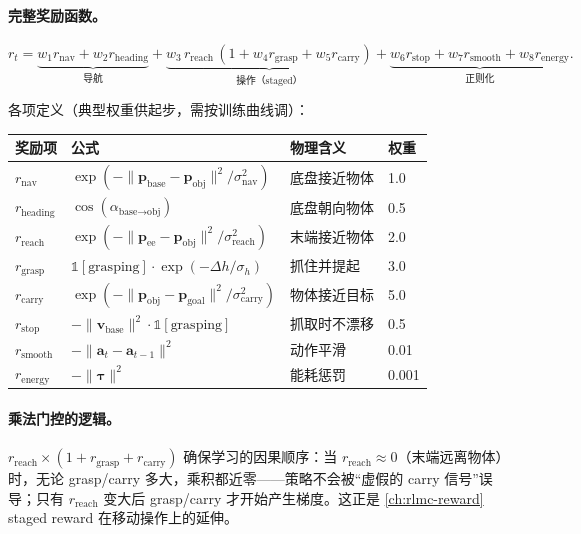 \paragraph{完整奖励函数。}

\begin{equation}
r_t=\underbrace{w_1 r_{\text{nav}}+w_2 r_{\text{heading}}}_{\text{导航}}
+\underbrace{w_3\, r_{\text{reach}}\,(1+w_4 r_{\text{grasp}}+w_5 r_{\text{carry}})}_{\text{操作（staged）}}
+\underbrace{w_6 r_{\text{stop}}+w_7 r_{\text{smooth}}+w_8 r_{\text{energy}}}_{\text{正则化}}.
\label{eq:rlmc-wh-reward}
\end{equation}

各项定义（典型权重供起步，需按训练曲线调）：

\begin{center}
\small
\begin{tabular}{@{}lll l@{}}
\toprule
奖励项 & 公式 & 物理含义 & 权重 \\
\midrule
$r_{\text{nav}}$ & $\exp(-\lVert\mathbf{p}_{\text{base}}-\mathbf{p}_{\text{obj}}\rVert^2/\sigma_{\text{nav}}^2)$ & 底盘接近物体 & 1.0 \\
$r_{\text{heading}}$ & $\cos(\alpha_{\text{base}\to\text{obj}})$ & 底盘朝向物体 & 0.5 \\
$r_{\text{reach}}$ & $\exp(-\lVert\mathbf{p}_{\text{ee}}-\mathbf{p}_{\text{obj}}\rVert^2/\sigma_{\text{reach}}^2)$ & 末端接近物体 & 2.0 \\
$r_{\text{grasp}}$ & $\mathbb{1}[\text{grasping}]\cdot\exp(-\Delta h/\sigma_h)$ & 抓住并提起 & 3.0 \\
$r_{\text{carry}}$ & $\exp(-\lVert\mathbf{p}_{\text{obj}}-\mathbf{p}_{\text{goal}}\rVert^2/\sigma_{\text{carry}}^2)$ & 物体接近目标 & 5.0 \\
$r_{\text{stop}}$ & $-\lVert\mathbf{v}_{\text{base}}\rVert^2\cdot\mathbb{1}[\text{grasping}]$ & 抓取时不漂移 & 0.5 \\
$r_{\text{smooth}}$ & $-\lVert\mathbf{a}_t-\mathbf{a}_{t-1}\rVert^2$ & 动作平滑 & 0.01 \\
$r_{\text{energy}}$ & $-\lVert\boldsymbol{\tau}\rVert^2$ & 能耗惩罚 & 0.001 \\
\bottomrule
\end{tabular}
\end{center}

\paragraph{乘法门控的逻辑。}$r_{\text{reach}}\times(1+r_{\text{grasp}}+r_{\text{carry}})$ 确保学习的因果顺序：当 $r_{\text{reach}}\approx0$（末端远离物体）时，无论 grasp/carry 多大，乘积都近零——策略不会被“虚假的 carry 信号”误导；只有 $r_{\text{reach}}$ 变大后 grasp/carry 才开始产生梯度。这正是 \cref{ch:rlmc-reward} staged reward 在移动操作上的延伸。

